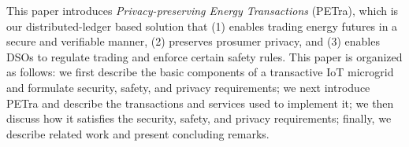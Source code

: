 This paper introduces %
\emph{Privacy-preserving Energy Transactions} (PETra), which is our
distributed-ledger based solution that (1) enables trading energy
futures in a secure and verifiable manner, (2) preserves prosumer
privacy, and (3) enables DSOs to regulate trading and enforce certain
safety rules.
%
This paper is organized as follows: we first describe
the basic components of a transactive IoT microgrid and formulate
security, safety, and privacy requirements; we next introduce PETra
and describe the transactions and services used to implement it; we
then discuss how it satisfies the security, safety, and privacy
requirements; finally, we 
describe related work
and present concluding remarks.


